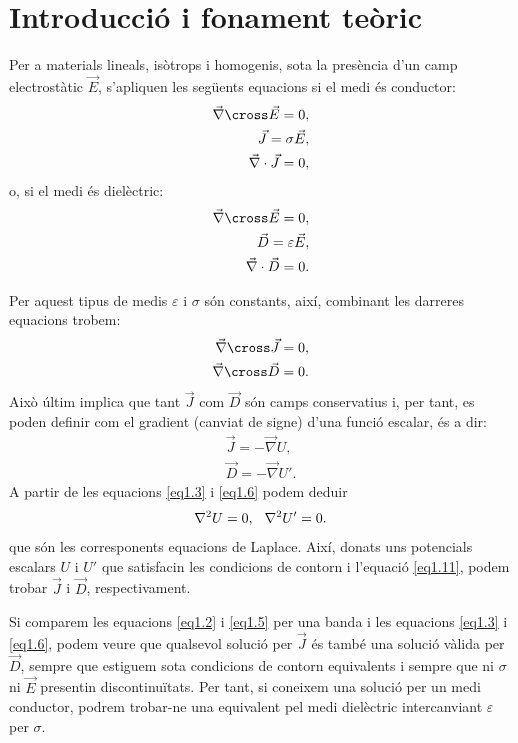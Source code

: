\documentclass[a4paper,10.5pt]{report}
\begin{document}
\section{Introducció i fonament teòric}
Per a materials lineals, isòtrops i homogenis, sota la presència d'un camp electrostàtic $\vec{E}$, s'apliquen les següents equacions si el medi és conductor:
\begin{align}
	\vec{\nabla} \cross \vec{E} = 0, \\
	\vec{J} = \sigma \vec{E} \label{eq1.2},  \\ 
	\vec{\nabla}\cdot \vec{J} = 0 \label{eq1.3},
\end{align}
o, si el medi és dielèctric:
\begin{align}
	\vec{\nabla} \cross \vec{E} = 0, \\
	\vec{D} = \varepsilon \vec{E} \label{eq1.5}, \\ 
	\vec{\nabla}\cdot \vec{D} = 0 \label{eq1.6}.
\end{align}

Per aquest tipus de medis $\varepsilon$ i $\sigma$ són constants, així, combinant les darreres equacions trobem:
\begin{align}
	\vec{\nabla} \cross \vec{J} = 0, \\
	\vec{\nabla} \cross \vec{D} = 0.
\end{align}
Això últim implica que tant $\vec{J}$ com $\vec{D}$ són camps conservatius i, per tant, es poden definir com el gradient (canviat de signe) d'una funció escalar, és a dir:
\begin{align}
	\vec{J} = -\vec{\nabla}{U}, \\
	\vec{D} = -\vec{\nabla}{U'}.
\end{align}
A partir de les equacions \eqref{eq1.3} i \eqref{eq1.6} podem deduir
\begin{equation}
	\nabla^2 U  = 0, \hspace{0.25cm} \nabla^2 U' = 0 \label{eq1.11}.
\end{equation}
que són les corresponents equacions de Laplace. Així, donats uns potencials escalars $U$ i $U'$ que satisfacin les condicions de contorn i l'equació \eqref{eq1.11}, podem trobar $\vec{J}$ i $\vec{D}$, respectivament.

Si comparem les equacions \eqref{eq1.2} i \eqref{eq1.5} per una banda i les equacions \eqref{eq1.3} i \eqref{eq1.6}, podem veure que qualsevol solució per $\vec{J}$ és també una solució vàlida per $\vec{D}$, sempre que estiguem sota condicions de contorn equivalents i sempre que ni $\sigma$ ni $\vec{E}$ presentin discontinuïtats. Per tant, si coneixem una solució per un medi conductor, podrem trobar-ne una equivalent pel medi dielèctric intercanviant $\varepsilon$ per $\sigma$.
\end{document}
